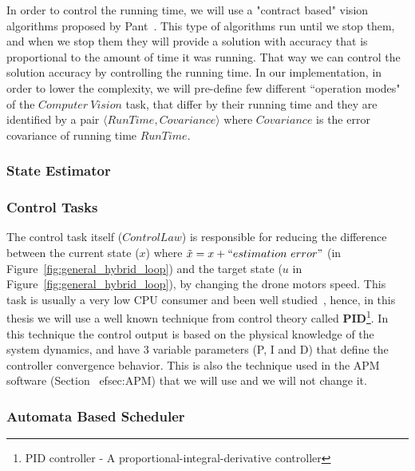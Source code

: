 \documentclass[11pt]{article}
\begin{document}
In order to control the running time, we will use a "contract based" vision algorithms proposed by Pant~\cite{UPenn-Pant}.
This type of algorithms run until we stop them, and when we stop them they will provide a solution with accuracy that is proportional to the amount of time it was running. That way we can control the solution accuracy by controlling the running time.
In our implementation, in order to lower the complexity, we will pre-define few different ``operation modes" of the $Computer~Vision$ task, that differ by their running time and they are identified by a pair $\langle RunTime, Covariance \rangle$ where $Covariance$ is the error covariance of running time $RunTime$.

\subsubsection{State Estimator}
\label{sec:estimator}

\subsubsection{Control Tasks}
The control task itself ($Control Law$) is responsible for reducing the difference between the current state ($x$) where $\tilde{x} = x+ ``estimation~error"$ (in Figure~\ref{fig:general_hybrid_loop}) and the target state ($u$ in Figure~\ref{fig:general_hybrid_loop}), by changing the drone motors speed.
This task is usually a very low CPU consumer and been well studied~\cite{PID}, hence, in this thesis we will use a well known technique from control theory called {\textbf{PID}\footnote{PID controller - A proportional-integral-derivative controller}}. 
In this technique the control output is based on the physical knowledge of the system dynamics, and have 3 variable parameters (P, I and D) that define the controller convergence behavior. 
This is also the technique used in the APM software (Section~
ef{sec:APM}) that we will use and we will not change it.

\subsubsection{Automata Based Scheduler}
\end{document}

